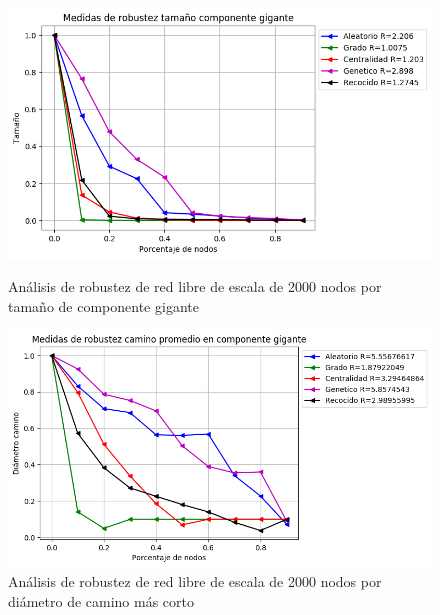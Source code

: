 \begin{figure}[!htb]
    \begin{minipage}{0.48\textwidth}
        \centering
        \includegraphics[scale=0.4]{CapituloAAnexos/imagenesAnexoC/Robustez/grafica_GC20180501_030914ScaleFree2000Nodes}
        \caption{Análisis de robustez de red libre de escala de 2000 nodos por tamaño de componente gigante}
    \end{minipage}\hfill
   \begin{minipage}{0.48\textwidth}
         \centering
       \includegraphics[scale=0.4]{CapituloAAnexos/imagenesAnexoC/Robustez/grafica_APL20180501_030914ScaleFree2000Nodes.png}
        \caption{Análisis de robustez de red libre de escala de 2000 nodos por diámetro de camino más corto}
    \end{minipage}
\end{figure}



